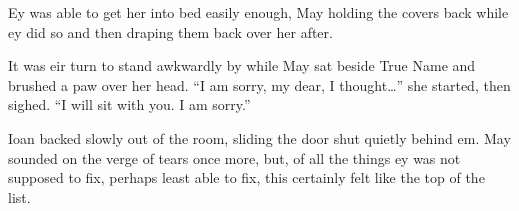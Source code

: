 Ey was able to get her into bed easily enough, May holding the covers back while ey did so and then draping them back over her after.

It was eir turn to stand awkwardly by while May sat beside True Name and brushed a paw over her head. ``I am sorry, my dear, I thought\ldots{}'' she started, then sighed. ``I will sit with you. I am sorry.''

Ioan backed slowly out of the room, sliding the door shut quietly behind em. May sounded on the verge of tears once more, but, of all the things ey was not supposed to fix, perhaps least able to fix, this certainly felt like the top of the list.
